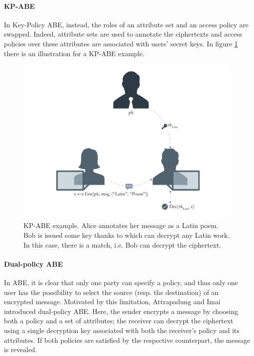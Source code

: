 \paragraph*{KP-ABE}
In Key-Policy ABE, instead, the roles of an attribute set and an access policy are swapped.
Indeed, attribute sets are used to annotate the ciphertexts and access policies over these attributes are associated with users’ secret keys.
In figure \ref{fig:kp_abe_example} there is an illustration for a KP-ABE example.
\begin{figure}[ht]
    \centering
    \includegraphics[width=\linewidth]{images/kp_abe.png}
    \caption{KP-ABE example. Alice annotates her message as a Latin poem. Bob is issued some key thanks to which can decrypt any Latin work. In this case, there is a match, i.e. Bob can decrypt the ciphertext.}
    \label{fig:kp_abe_example}
\end{figure}

\paragraph*{Dual-policy ABE}
In ABE, it is clear that only one party can specify a policy, and thus only one user has the possibility to select the source (resp. the destination) of an encrypted message.
Motivated by this limitation, Attrapadung and Imai \cite{Attrapadung} introduced dual-policy ABE.
Here, the sender encrypts a message by choosing both a policy and a set of attributes; the receiver can decrypt the ciphertext using a single decryption key associated with both the receiver's policy and its attributes.
If both policies are satisfied by the respective counterpart, the message is revealed.
